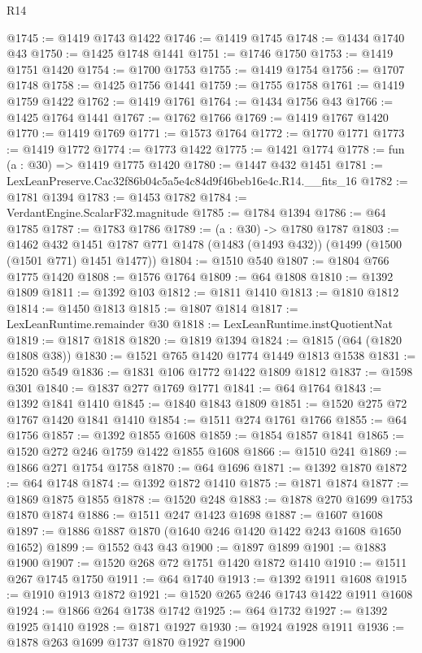 \begin{lexlean}{R14}
\begin{coremodule}
@1745 := @1419 @1743 @1422
@1746 := @1419 @1745
@1748 := @1434 @1740 @43
@1750 := @1425 @1748 @1441
@1751 := @1746 @1750
@1753 := @1419 @1751 @1420
@1754 := @1700 @1753
@1755 := @1419 @1754
@1756 := @1707 @1748
@1758 := @1425 @1756 @1441
@1759 := @1755 @1758
@1761 := @1419 @1759 @1422
@1762 := @1419 @1761
@1764 := @1434 @1756 @43
@1766 := @1425 @1764 @1441
@1767 := @1762 @1766
@1769 := @1419 @1767 @1420
@1770 := @1419 @1769
@1771 := @1573 @1764
@1772 := @1770 @1771
@1773 := @1419 @1772
@1774 := @1773 @1422
@1775 := @1421 @1774
@1778 := fun (a : @30) => @1419 @1775 @1420
@1780 := @1447 @432 @1451
@1781 := LexLeanPreserve.Cac32f86b04c5a5e4c84d9f46beb16e4c.R14.__fits_16
@1782 := @1781 @1394
@1783 := @1453 @1782
@1784 := VerdantEngine.ScalarF32.magnitude
@1785 := @1784 @1394
@1786 := @64 @1785
@1787 := @1783 @1786
@1789 := (a : @30) -> @1780 @1787
@1803 := @1462
    @432
    @1451
    @1787
    @771
    @1478
    (@1483 (@1493 @432))
    (@1499 (@1500 (@1501 @771) @1451 @1477))
@1804 := @1510 @540
@1807 := @1804 @766 @1775 @1420
@1808 := @1576 @1764
@1809 := @64 @1808
@1810 := @1392 @1809
@1811 := @1392 @103
@1812 := @1811 @1410
@1813 := @1810 @1812
@1814 := @1450 @1813
@1815 := @1807 @1814
@1817 := LexLeanRuntime.remainder @30
@1818 := LexLeanRuntime.instQuotientNat
@1819 := @1817 @1818
@1820 := @1819 @1394
@1824 := @1815 (@64 (@1820 @1808 @38))
@1830 := @1521 @765 @1420 @1774 @1449 @1813 @1538
@1831 := @1520 @549
@1836 := @1831 @106 @1772 @1422 @1809 @1812
@1837 := @1598 @301
@1840 := @1837 @277 @1769 @1771
@1841 := @64 @1764
@1843 := @1392 @1841 @1410
@1845 := @1840 @1843 @1809
@1851 := @1520 @275 @72 @1767 @1420 @1841 @1410
@1854 := @1511 @274 @1761 @1766
@1855 := @64 @1756
@1857 := @1392 @1855 @1608
@1859 := @1854 @1857 @1841
@1865 := @1520 @272 @246 @1759 @1422 @1855 @1608
@1866 := @1510 @241
@1869 := @1866 @271 @1754 @1758
@1870 := @64 @1696
@1871 := @1392 @1870
@1872 := @64 @1748
@1874 := @1392 @1872 @1410
@1875 := @1871 @1874
@1877 := @1869 @1875 @1855
@1878 := @1520 @248
@1883 := @1878 @270 @1699 @1753 @1870 @1874
@1886 := @1511 @247 @1423 @1698
@1887 := @1607 @1608
@1897 := @1886 @1887 @1870 (@1640 @246 @1420 @1422 @243 @1608 @1650 @1652)
@1899 := @1552 @43 @43
@1900 := @1897 @1899
@1901 := @1883 @1900
@1907 := @1520 @268 @72 @1751 @1420 @1872 @1410
@1910 := @1511 @267 @1745 @1750
@1911 := @64 @1740
@1913 := @1392 @1911 @1608
@1915 := @1910 @1913 @1872
@1921 := @1520 @265 @246 @1743 @1422 @1911 @1608
@1924 := @1866 @264 @1738 @1742
@1925 := @64 @1732
@1927 := @1392 @1925 @1410
@1928 := @1871 @1927
@1930 := @1924 @1928 @1911
@1936 := @1878 @263 @1699 @1737 @1870 @1927 @1900

\end{coremodule}
\end{lexlean}
